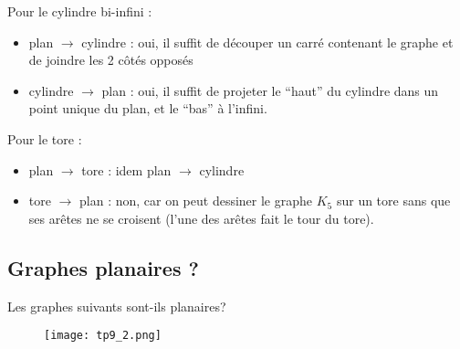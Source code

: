 \begin{solution}
Pour le cylindre bi-infini : 
\begin{itemize}
\item plan $\longrightarrow$ cylindre : oui, il suffit de découper un carré contenant le graphe et de joindre les 2 côtés opposés
\item cylindre $\longrightarrow$ plan : oui, il suffit de projeter le ``haut'' du cylindre dans un point unique du plan, et le ``bas'' à l'infini. \\
\end{itemize}

Pour le tore : 
\begin{itemize}
\item plan $\longrightarrow$ tore : idem plan $\longrightarrow$ cylindre
\item tore $\longrightarrow$ plan : non, car on peut dessiner le graphe $K_5$ sur un tore sans que ses arêtes ne se croisent (l'une des arêtes fait le tour du tore).
\end{itemize}
\end{solution}

\subsection{Graphes planaires ?} Les graphes suivants sont-ils planaires?

\begin{figure}[h!]
  \begin{center}
    \texttt{[image: tp9\_2.png]}
      \end{center}
\end{figure}

